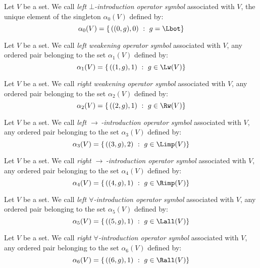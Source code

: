 \begin{defin}\label{logic:def:GENZ:symbols:Lw}
Let $V$ be a set. We call {\em left $\bot$-introduction operator
symbol} associated with $V$, the unique element of the singleton
$\alpha_{0}(V)$ defined by:
    \[
    \alpha_{0}(V)=\{\,((0,g),0)\ :\ g=\Lbot\}
    \]
\end{defin}

\begin{defin}\label{logic:def:GENZ:symbols:Lw}
Let $V$ be a set. We call {\em left weakening operator symbol}
associated with $V$, any ordered pair belonging to the set
$\alpha_{1}(V)$ defined by:
    \[
    \alpha_{1}(V)=\{\,((1,g),1)\ :\ g\in\Lw(V)\}
    \]
\end{defin}

\begin{defin}\label{logic:def:GENZ:symbols:Rw}
Let $V$ be a set. We call {\em right weakening operator symbol}
associated with $V$, any ordered pair belonging to the set
$\alpha_{2}(V)$ defined by:
    \[
    \alpha_{2}(V)=\{\,((2,g),1)\ :\ g\in\Rw(V)\}
    \]
\end{defin}

\begin{defin}\label{logic:def:GENZ:symbols:Limp}
Let $V$ be a set. We call {\em left $\to\,$-introduction operator
symbol} associated with $V$, any ordered pair belonging to the set
$\alpha_{3}(V)$ defined by:
    \[
    \alpha_{3}(V)=\{\,((3,g),2)\ :\ g\in\Limp(V)\}
    \]
\end{defin}

\begin{defin}\label{logic:def:GENZ:symbols:Rimp}
Let $V$ be a set. We call {\em right $\to\,$-introduction operator
symbol} associated with $V$, any ordered pair belonging to the set
$\alpha_{4}(V)$ defined by:
    \[
    \alpha_{4}(V)=\{\,((4,g),1)\ :\ g\in\Rimp(V)\}
    \]
\end{defin}


\begin{defin}\label{logic:def:GENZ:symbols:Lall}
Let $V$ be a set. We call {\em left $\forall$-introduction operator
symbol} associated with $V$, any ordered pair belonging to the set
$\alpha_{5}(V)$ defined by:
    \[
    \alpha_{5}(V)=\{\,((5,g),1)\ :\ g\in\Lall(V)\}
    \]
\end{defin}


\begin{defin}\label{logic:def:GENZ:symbols:Rall}
Let $V$ be a set. We call {\em right $\forall$-introduction operator
symbol} associated with $V$, any ordered pair belonging to the set
$\alpha_{6}(V)$ defined by:
    \[
    \alpha_{6}(V)=\{\,((6,g),1)\ :\ g\in\Rall(V)\}
    \]
\end{defin}
